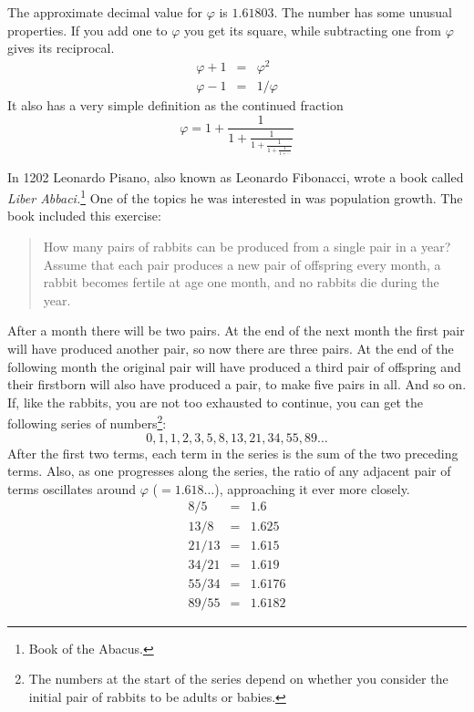 \documentclass[10pt,a4paper,oneside,extrafontsizes]{memoir}%
\begin{document}
\begin{paracol}{2}
    The approximate decimal value for $\varphi$ is $1.61803$. 
The number has some unusual properties. If you add one to $\varphi$
you get its square, while subtracting one from $\varphi$ gives its 
reciprocal.
\begin{eqnarray}
  \varphi + 1 & = & \varphi^{2} \\
  \varphi - 1 & = & 1/\varphi
\end{eqnarray}
It also has a very simple definition as the continued fraction
\begin{equation}
\varphi = 1 + \frac{1}{\displaystyle 1 + \frac{1}{\displaystyle 1 + \frac{1}{\displaystyle 1 + \frac{1}{1 + \cdots}}}}
\end{equation}


    In 1202 Leonardo Pisano, 
also known as Leonardo Fibonacci, wrote a
book called \textit{Liber Abbaci.}\footnote{Book of the Abacus.} One of the 
topics he was interested in was population growth. The book included
this exercise: 
\begin{quote}
How many pairs of rabbits can be produced from a single 
pair in a year?
Assume that each pair produces a new pair of offspring every month,
a rabbit becomes fertile at age one month, and no rabbits die during the
year.
\end{quote}
After a month there will be two pairs. At the end of the next month the
first pair will have produced another pair, so now there are three pairs.
At the end of the following  month the original pair will have produced a
third pair of offspring and their firstborn will also have produced a pair, 
to make five pairs in all. And so on. 
If, like the rabbits, you are not too exhausted
to continue, you can get the following series of 
numbers\footnote{The numbers at the start of the series
depend on whether you consider the initial pair of rabbits to be adults or 
babies.\label{fn:rabbits}}:
\begin{displaymath}
0,1,1,2,3,5,8,13,21,34, 55, 89 \ldots
\end{displaymath}
After the first two terms, each term in the series is the sum of the two
preceding terms. Also, as one progresses along the series, the ratio of
any adjacent pair of terms oscillates around $\varphi$ ($= 1.618 \ldots$),
approaching it ever more closely.
\begin{eqnarray*}
  8/5 & = & 1.6 \\
  13/8 & = & 1.625 \\
  21/13 & = & 1.615 \\
  34/21 & = & 1.619 \\
  55/34 & = & 1.6176 \\
  89/55 & = & 1.6182
\end{eqnarray*}


\end{paracol}
\end{document}
